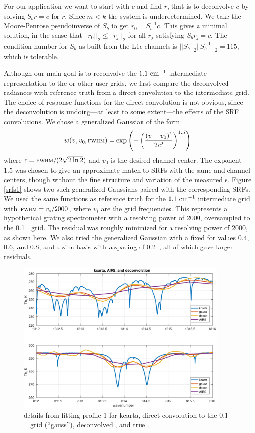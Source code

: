 \documentclass[11pt]{article}
\begin{document}
For our application we want to start with $c$ and find $r$, that is
to deconvolve $c$ by solving $S_b r = c$ for $r$.  Since $m < k$ the
system is underdetermined.  We take the Moore-Penrose pseudoinverse
\cite{pinv} of $S_b$ to get $r_0 = S_b^{-1} c$.  This gives a
minimal solution, in the sense that $||r_0||_2 \le ||r_j||_2$ for
all $r_j$ satisfying $S_b r_j = c$.  The condition number for $S_b$
as built from the L1c channels is $||S_b||_2||S_b^{-1}||_2 = 115$,
which is tolerable.

Although our main goal is to reconvolve the $0.1~\mbox{cm$^{-1}$}$ intermediate
representation to the {\cris} or other user grids, we first compare
the deconvolved radiances with reference truth from a direct
convolution to the intermediate grid.  The choice of response
functions for the direct convolution is not obvious, since the
deconvolution is undoing---at least to some extent---the effects of
the {\airs} SRF convolutions.  We chose a generalized Gaussian of
the form
\[w(v, v_0, \mbox{\small\textsc{fwhm}}) = 
\exp\left(-\left(\frac{(v - v_0)^2}{2c^2}\right)^{1.5}\right) \]
where $c=\mbox{\small\textsc{fwhm}} / (2\sqrt{2\ln 2})$ and $v_0$ is the desired channel
center.  The exponent $1.5$ was chosen to give an approximate match
to {\airs} SRFs with the same {\FWHM} and channel centers, though
without the fine structure and variation of the measured \srf s.
Figure \ref{srfs1} shows two such generalized Gaussians paired with
the corresponding {\airs} SRFs.  We used the same functions as
reference truth for the $0.1~\mbox{cm$^{-1}$}$ intermediate grid with ${\mbox{\small\textsc{fwhm}}} =
v_i / 2000$, where $v_i$ are the grid frequencies.  This represents
a hypothetical grating spectrometer with a resolving power of 2000,
oversampled to the 0.1~\wn\ grid.  The residual was roughly
minimized for a resolving power of 2000, as shown here.  We also
tried the generalized Gaussian with a fixed {\FWHM} for values
$0.4$, $0.6$, and $0.8$, and a sinc basis with a spacing of
$0.2$~\wn, all of which gave larger residuals.

\begin{figure} %
  \centering
  \includegraphics[height=7.5cm]{figures/airs_decon_zoom.pdf}
  \caption{details from fitting profile 1 for kcarta, direct
    convolution to the $0.1$~\wn\ grid (``gauss''), deconvolved
    {\airs}, and true {\airs}.}
  \label{dzoom}
\end{figure}
\end{document}
